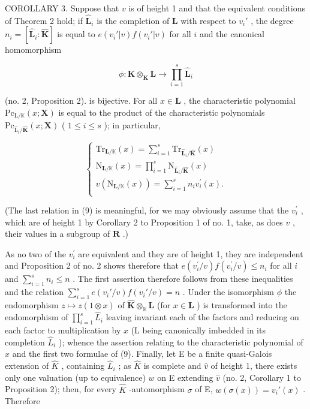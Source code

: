 COROLLARY 3. Suppose that \(v\) is of height 1 and that the equivalent conditions of Theorem 2 hold; if \(\hat{\mathbf{L}}_i\) is the completion of \(\mathbf{L}\) with respect to \(v_i'\) , the degree \(n_i = [\hat{\mathbf{L}}_i: \hat{\mathbf{K}}]\) is equal to \(e(v_i'|v)f(v_i'|v)\) for all \(i\) and the canonical homomorphism

\[
\phi \colon \hat {\mathbf {K}} \otimes_ {\mathbf {K}} \mathbf {L} \rightarrow \prod_ {i = 1} ^ {s} \hat {\mathbf {L}} _ {i}
\]

(no. 2, Proposition 2). is bijective. For all \(x \in \mathbf{L}\) , the characteristic polynomial \(\mathrm{Pc}_{\mathrm{L} / \mathbb{K}}(x; \mathbf{X})\) is equal to the product of the characteristic polynomials \(\mathrm{Pc}_{\hat{\mathrm{L}}_i / \hat{\mathbf{K}}}(x; \mathbf{X})\) ( \(1 \leqslant i \leqslant s\) ); in particular,

\[
\left\{ \begin{array} { l } \mathrm{Tr} _ { \mathbf { L } / \mathbb { K } } ( x ) = \sum _ { i = 1 } ^ { s } \mathrm{Tr} _ { \hat { \mathbf { L } } _ { i } / \hat { \mathbf { K } } } ( x ) \\ \mathrm{N} _ { \mathbf { L } / \mathbb { K } } ( x ) = \prod _ { i = 1 } ^ { s } \mathrm{N} _ { \hat { \mathbf { L } } _ { i } / \hat { \mathbf { K } } } ( x ) \\ v ( \mathrm{N} _ { \mathbf { L } / \mathbb { K } } ( x ) ) = \sum _ { i = 1 } ^ { s } n _ { i } v _ { i } ^ { \prime } ( x ) . \\ \end{array} \right.\tag{9}
\]

(The last relation in (9) is meaningful, for we may obviously assume that the \(v_{i}^{\prime}\) , which are of height 1 by Corollary 2 to Proposition 1 of no. 1, take, as does \(v\) , their values in a subgroup of \(\mathbf{R}\) .)

As no two of the \(v_{i}^{\prime}\) are equivalent and they are of height 1, they are independent and Proposition 2 of no. 2 shows therefore that \(e(v_{i}^{\prime}/v)f(v_{i}^{\prime}/v) \leqslant n_{i}\) for all \(i\) and \(\sum_{i=1}^{s} n_i \leqslant n\) . The first assertion therefore follows from these inequalities and the relation \(\sum_{i=1}^{s} e(v_i'/v) f(v_i'/v) = n\) . Under the isomorphism \(\phi\) the endomorphism \(z \mapsto z(1 \otimes x)\) of \(\hat{\mathbf{K}} \otimes_{\mathbb{K}} \mathbf{L}\) (for \(x \in \mathbf{L}\) ) is transformed into the endomorphism of \(\prod_{i=1}^{s}\hat{L}_i\) leaving invariant each of the factors and reducing on each factor to multiplication by \(x\) (L being canonically imbedded in its completion \(\hat{L}_i\) ); whence the assertion relating to the characteristic polynomial of \(x\) and the first two formulae of (9). Finally, let E be a finite quasi-Galois extension of \(\hat{K}\) , containing \(\hat{L}_i\) ; as \(\hat{K}\) is complete and \(\hat{v}\) of height 1, there exists only one valuation (up to equivalence) \(w\) on E extending \(\hat{v}\) (no. 2, Corollary 1 to Proposition 2); then, for every \(\hat{K}\) -automorphism \(\sigma\) of E, \(w(\sigma(x)) = v_i'(x)\) . Therefore

